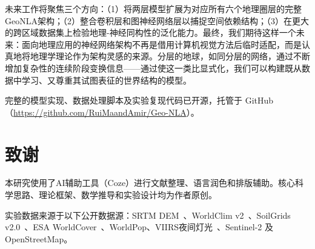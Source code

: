 \documentclass[11pt,a4paper]{article}
\begin{document}
未来工作将聚焦三个方向：（1）将两层模型扩展为对应所有六个地理圈层的完整GeoNLA架构；（2）整合卷积层和图神经网络层以捕捉空间依赖结构；（3）在更大的跨区域数据集上检验地理-神经同构性的泛化能力。最终，我们期待这样一个未来：面向地理应用的神经网络架构不再是借用计算机视觉方法后临时适配，而是认真地将地理学理论作为架构灵感的来源。分层的地球，如同分层的网络，通过不断增加复杂性的连续阶段变换信息——通过使这一类比显式化，我们可以构建既从数据中学习、又尊重其试图表征的世界结构的模型。

完整的模型实现、数据处理脚本及实验复现代码已开源，托管于 GitHub（\url{https://github.com/RuiMaandAmir/Geo-NLA}）\cite{ma2026}。

\section*{致谢}

本研究使用了AI辅助工具（Coze）进行文献整理、语言润色和排版辅助。核心科学思路、理论框架、数学推导和实验设计均为作者原创。

实验数据来源于以下公开数据源：SRTM DEM~\cite{nasa2013}、WorldClim v2~\cite{fick2017}、SoilGrids v2.0~\cite{poggio2021}、ESA WorldCover~\cite{esa2021}、WorldPop、VIIRS夜间灯光~\cite{elvidge2021}、Sentinel-2 及 OpenStreetMap。
\end{document}
